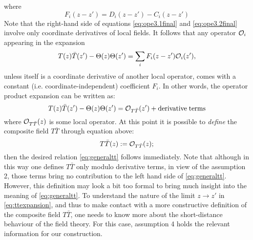   where 
  \begin{equation}
    F_i(z-z') = D_i(z-z') - C_i(z-z')
  \end{equation}
  Note that the right-hand side of equations \eqref{eq:ope3.1final} and
  \eqref{eq:ope3.2final} involve only coordinate derivatives of local
fields. It follows that any operator $\mathcal{O}_i$ appearing in the expansion
\begin{equation}
  T(z)\bar{T}(z') - \Theta(z)\Theta(z') = \sum_i F_i(z-z')\mathcal{O}_i(z'),
  \label{eq:ttexpansion}
\end{equation}
unless itself is a coordinate derivative of another local operator, comes with
a constant (i.e. coordinate-independent) coefficient $F_i$. In other words, the
operator product expansion can be written as:
\begin{equation}
  T(z)\bar{T}(z') - \Theta(z)\Theta(z') = \mathcal{O}_{T\bar{T}}(z')
  + \mathrm{derivative\;terms}
\end{equation}
where $\mathcal{O}_{T\bar{T}}(z)$ is some local operator. At this point it is
possible to \textit{define} the composite field $T\bar{T}$ through equation
above:
\begin{equation}
  T\bar{T}(z):= \mathcal{O}_{T\bar{T}}(z);
\end{equation}
then the desired relation \eqref{eq:generaltt} follows immediately. Note
that although in this way one defines $T\bar{T}$ only modulo derivative
terms, in view of the assumption 2, those terms bring no contribution to the
left hand side of \eqref{eq:generaltt}. However, this definition may look a bit
too formal to bring much insight into the meaning of \eqref{eq:generaltt}. To
understand the nature of the limit $z\rightarrow z'$ in
\eqref{eq:ttexpansion}, and thus to make contact with a more constructive
definition of the composite field $T\bar{T}$, one needs to know more about the 
short-distance behaviour of the field theory. For this case, assumption 4 holds
the relevant information for our construction.
